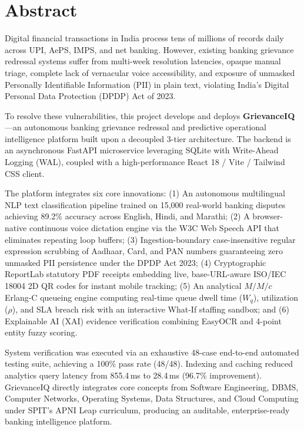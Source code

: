 \documentclass[12pt,singleside,a4paper]{article}
\begin{document}
\section*{Abstract}
Digital financial transactions in India process tens of millions of records daily across UPI, AePS, IMPS, and net banking. However, existing banking grievance redressal systems suffer from multi-week resolution latencies, opaque manual triage, complete lack of vernacular voice accessibility, and exposure of unmasked Personally Identifiable Information (PII) in plain text, violating India's Digital Personal Data Protection (DPDP) Act of 2023.

To resolve these vulnerabilities, this project develops and deploys \textbf{GrievanceIQ}—an autonomous banking grievance redressal and predictive operational intelligence platform built upon a decoupled 3-tier architecture. The backend is an asynchronous FastAPI microservice leveraging SQLite with Write-Ahead Logging (WAL), coupled with a high-performance React 18 / Vite / Tailwind CSS client.

The platform integrates six core innovations: (1) An autonomous multilingual NLP text classification pipeline trained on 15,000 real-world banking disputes achieving 89.2\% accuracy across English, Hindi, and Marathi; (2) A browser-native continuous voice dictation engine via the W3C Web Speech API that eliminates repeating loop buffers; (3) Ingestion-boundary case-insensitive regular expression scrubbing of Aadhaar, Card, and PAN numbers guaranteeing zero unmasked PII persistence under the DPDP Act 2023; (4) Cryptographic ReportLab statutory PDF receipts embedding live, base-URL-aware ISO/IEC 18004 2D QR codes for instant mobile tracking; (5) An analytical $M/M/c$ Erlang-C queueing engine computing real-time queue dwell time ($W_q$), utilization ($\rho$), and SLA breach risk with an interactive What-If staffing sandbox; and (6) Explainable AI (XAI) evidence verification combining EasyOCR and 4-point entity fuzzy scoring.

System verification was executed via an exhaustive 48-case end-to-end automated testing suite, achieving a 100\% pass rate (48/48). Indexing and caching reduced analytics query latency from 855.4\,ms to 28.4\,ms (96.7\% improvement). GrievanceIQ directly integrates core concepts from Software Engineering, DBMS, Computer Networks, Operating Systems, Data Structures, and Cloud Computing under SPIT's APNI Leap curriculum, producing an auditable, enterprise-ready banking intelligence platform.
\end{document}
